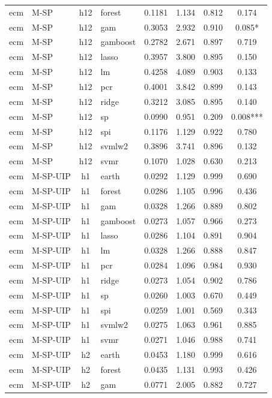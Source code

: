\begin{ThreePartTable}
\begin{longtable}[t]{llclcccc}
ecm & M-SP & h12 & forest & 0.1181 & 1.134 & 0.812 & 0.174\\
ecm & M-SP & h12 & gam & 0.3053 & 2.932 & 0.910 & 0.085*\\
ecm & M-SP & h12 & gamboost & 0.2782 & 2.671 & 0.897 & 0.719\\
ecm & M-SP & h12 & lasso & 0.3957 & 3.800 & 0.895 & 0.150\\
ecm & M-SP & h12 & lm & 0.4258 & 4.089 & 0.903 & 0.133\\
ecm & M-SP & h12 & pcr & 0.4001 & 3.842 & 0.899 & 0.143\\
ecm & M-SP & h12 & ridge & 0.3212 & 3.085 & 0.895 & 0.140\\
ecm & M-SP & h12 & sp & 0.0990 & 0.951 & 0.209 & 0.008***\\
ecm & M-SP & h12 & spi & 0.1176 & 1.129 & 0.922 & 0.780\\
ecm & M-SP & h12 & svmlw2 & 0.3896 & 3.741 & 0.896 & 0.132\\
ecm & M-SP & h12 & svmr & 0.1070 & 1.028 & 0.630 & 0.213\\
\addlinespace
ecm & M-SP-UIP & h1 & earth & 0.0292 & 1.129 & 0.999 & 0.690\\
ecm & M-SP-UIP & h1 & forest & 0.0286 & 1.105 & 0.996 & 0.436\\
ecm & M-SP-UIP & h1 & gam & 0.0328 & 1.266 & 0.889 & 0.802\\
ecm & M-SP-UIP & h1 & gamboost & 0.0273 & 1.057 & 0.966 & 0.273\\
ecm & M-SP-UIP & h1 & lasso & 0.0286 & 1.104 & 0.891 & 0.904\\
ecm & M-SP-UIP & h1 & lm & 0.0328 & 1.266 & 0.888 & 0.847\\
ecm & M-SP-UIP & h1 & pcr & 0.0284 & 1.096 & 0.984 & 0.930\\
ecm & M-SP-UIP & h1 & ridge & 0.0273 & 1.054 & 0.902 & 0.786\\
ecm & M-SP-UIP & h1 & sp & 0.0260 & 1.003 & 0.670 & 0.449\\
ecm & M-SP-UIP & h1 & spi & 0.0259 & 1.001 & 0.569 & 0.343\\
ecm & M-SP-UIP & h1 & svmlw2 & 0.0275 & 1.063 & 0.961 & 0.885\\
ecm & M-SP-UIP & h1 & svmr & 0.0271 & 1.046 & 0.988 & 0.741\\
\addlinespace
ecm & M-SP-UIP & h2 & earth & 0.0453 & 1.180 & 0.999 & 0.616\\
ecm & M-SP-UIP & h2 & forest & 0.0435 & 1.131 & 0.993 & 0.426\\
ecm & M-SP-UIP & h2 & gam & 0.0771 & 2.005 & 0.882 & 0.727\\

\end{longtable}
\end{ThreePartTable}
